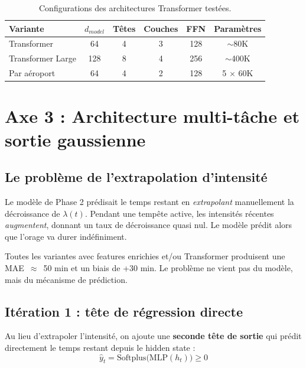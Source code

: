 \documentclass[11pt,a4paper]{article}
\newenvironment{keybox}[1]
  {\begin{tcolorbox}[colback=meteoGray,colframe=meteoBlue,title={\textbf{#1}},
    fonttitle=\small, boxrule=0.6pt, arc=3pt]}
  {\end{tcolorbox}}
\begin{document}
\begin{table}[H]
\centering
\small
\begin{tabular}{@{}lccccc@{}}
\toprule
\textbf{Variante} & $d_{model}$ & \textbf{Têtes} & \textbf{Couches} & \textbf{FFN} & \textbf{Paramètres} \\
\midrule
Transformer       & 64  & 4 & 3 & 128 & $\sim$80K \\
Transformer Large & 128 & 8 & 4 & 256 & $\sim$400K \\
Par aéroport      & 64  & 4 & 2 & 128 & 5 $\times$ 60K \\
\bottomrule
\end{tabular}
\caption{Configurations des architectures Transformer testées.}
\end{table}


\section{Axe 3 : Architecture multi-tâche et sortie gaussienne}

\subsection{Le problème de l'extrapolation d'intensité}

Le modèle de Phase 2 prédisait le temps restant en \emph{extrapolant} manuellement la décroissance de $\lambda(t)$. Pendant une tempête active, les intensités récentes \emph{augmentent}, donnant un taux de décroissance quasi nul. Le modèle prédit alors que l'orage va durer indéfiniment.

\begin{keybox}{Constat — Itération 0 (extrapolation brute)}
Toutes les variantes avec features enrichies et/ou Transformer produisent une MAE~$\approx$~50 min et un biais de +30 min. Le problème ne vient pas du modèle, mais du mécanisme de prédiction.
\end{keybox}

\subsection{Itération 1 : tête de régression directe}

Au lieu d'extrapoler l'intensité, on ajoute une \textbf{seconde tête de sortie} qui prédit directement le temps restant depuis le hidden state :
\begin{equation}
\hat{y}_t = \text{Softplus}\big(\text{MLP}(h_t)\big) \geq 0
\end{equation}
\end{document}
